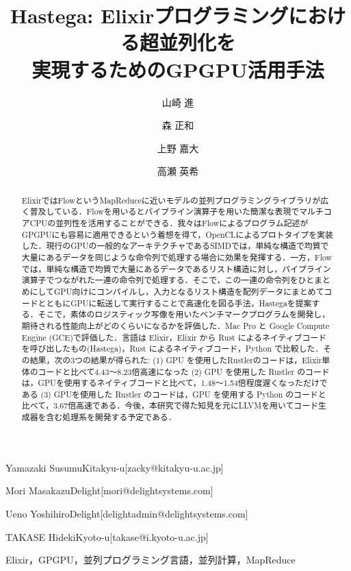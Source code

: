 \documentclass[submit,techrep]{ipsj}
\begin{document}
\title{Hastega: Elixirプログラミングにおける超並列化を\\実現するためのGPGPU活用手法}



\author{山崎 進}{Yamazaki Susumu}{Kitakyu-u}[zacky@kitakyu-u.ac.jp]
\author{森 正和}{Mori Masakazu}{Delight}[mori@delightsystems.com]
\author{上野 嘉大}{Ueno Yoshihiro}{Delight}[delightadmin@delightsystems.com]
\author{高瀬 英希}{TAKASE Hideki}{Kyoto-u}[takase@i.kyoto-u.ac.jp]

\begin{abstract}
ElixirではFlowというMapReduceに近いモデルの並列プログラミングライブラリが広く普及している．Flowを用いるとパイプライン演算子を用いた簡潔な表現でマルチコアCPUの並列性を活用することができる．我々はFlowによるプログラム記述がGPGPUにも容易に適用できるという着想を得て，OpenCLによるプロトタイプを実装した．現行のGPUの一般的なアーキテクチャであるSIMDでは，単純な構造で均質で大量にあるデータを同じような命令列で処理する場合に効果を発揮する．一方，Flowでは，単純な構造で均質で大量にあるデータであるリスト構造に対し，パイプライン演算子でつながれた一連の命令列で処理する．そこで，この一連の命令列をひとまとめにしてGPU向けにコンパイルし，入力となるリスト構造を配列データにまとめてコードとともにGPUに転送して実行することで高速化を図る手法，Hastegaを提案する．そこで，素体のロジスティック写像を用いたベンチマークプログラムを開発し，期待される性能向上がどのくらいになるかを評価した．Mac Pro と Google Compute Engine (GCE)で評価した．言語は Elixir，Elixir から Rust によるネイティブコードを呼び出したもの(Hastega)，Rust によるネイティブコード，Python で比較した．その結果，次の3つの結果が得られた: (1) GPU を使用したRustlerのコードは，Elixir単体のコードと比べて4.43〜8.23倍高速になった (2) GPU を使用した Rustler のコードは，GPUを使用するネイティブコードと比べて，1.48〜1.54倍程度遅くなっただけである (3) GPUを使用した Rustler のコードは，GPU を使用する Python のコードと比べて，3.67倍高速である．今後，本研究で得た知見を元にLLVMを用いてコード生成器を含む処理系を開発する予定である．
\end{abstract}


\begin{jkeyword}
Elixir，GPGPU，並列プログラミング言語，並列計算，MapReduce
\end{jkeyword}
\end{document}
